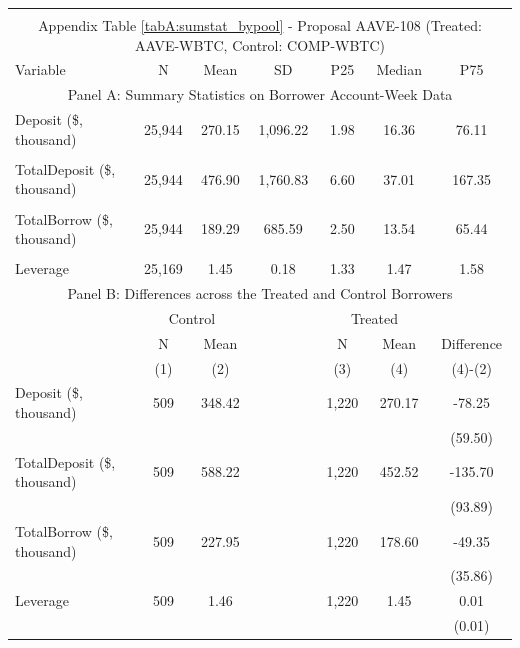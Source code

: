 \begin{table}[ht!]
\begin{tabular*}{\linewidth}{@{\extracolsep{\fill}}lcccccc }
              &       &       &       &       &       &  \\
      \multicolumn{7}{c}{Appendix Table \ref{tabA:sumstat_bypool} - Proposal AAVE-108 (Treated: AAVE-WBTC, Control: COMP-WBTC)} \\
         \toprule
     Variable  &N & Mean & SD & P25 & Median & P75 \\
     \midrule
    \multicolumn{7}{c}{Panel A: Summary Statistics on Borrower Account-Week Data} \\
    \midrule
    Deposit (\$, thousand) & 25,944 & 270.15 & 1,096.22 & 1.98  & 16.36 & 76.11 \\
          &       &       &       &       &       &  \\
    TotalDeposit (\$, thousand) & 25,944 & 476.90 & 1,760.83 & 6.60  & 37.01 & 167.35 \\
          &       &       &       &       &       &  \\
    TotalBorrow (\$, thousand) & 25,944 & 189.29 & 685.59 & 2.50  & 13.54 & 65.44 \\
          &       &       &       &       &       &  \\
    Leverage & 25,169 & 1.45  & 0.18  & 1.33  & 1.47  & 1.58 \\
    \midrule
        \multicolumn{7}{c}{Panel B: Differences across the Treated and Control Borrowers} \\
\midrule
          & \multicolumn{2}{c}{Control} &       & \multicolumn{2}{c}{Treated} &  \\
\cmidrule{2-3}\cmidrule{5-6}          & N & Mean &       & N & Mean & Difference \\
\cmidrule{2-3}\cmidrule{5-6}          & (1) & (2) &       & (3) & (4) & (4)-(2) \\
\cmidrule{2-7}    Deposit (\$, thousand) & 509   & 348.42 &       & 1,220 & 270.17 & -78.25 \\
          &       &       &       &       &       & (59.50) \\
    TotalDeposit (\$, thousand) & 509   & 588.22 &       & 1,220 & 452.52 & -135.70 \\
          &       &       &       &       &       & (93.89) \\
    TotalBorrow (\$, thousand) & 509   & 227.95 &       & 1,220 & 178.60 & -49.35 \\
          &       &       &       &       &       & (35.86) \\
    Leverage & 509   & 1.46  &       & 1,220 & 1.45  & 0.01 \\
          &       &       &       &       &       & (0.01) \\
    \bottomrule
          \end{tabular*} 



\end{table}%

